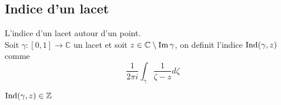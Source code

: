 \documentclass[../main.tex]{subfiles}
\begin{document}
\subsection{Indice d'un lacet}
L'indice d'un lacet autour d'un point.\\
Soit $\gamma: [ 0,1] \to \mathbb{C}$ un lacet et soit $z\in \mathbb{C}\setminus \operatorname{Im}\gamma $, on definit l'indice $\operatorname{Ind}( \gamma,z) $ comme
\[ 
\frac{1}{2\pi i}\int_{ \gamma }^{  } \frac{1}{\zeta-z}d\zeta
\]
\begin{propo}
	$\operatorname{Ind}( \gamma,z) \in \mathbb{Z}$ 
\end{propo}




	
		
		



	
\end{document}
